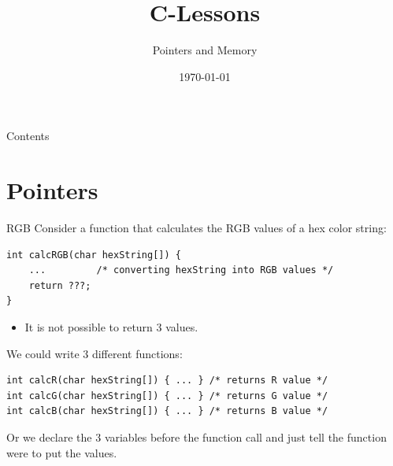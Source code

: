


\title{C-Lessons}
\subtitle{Pointers and Memory}
\date{\today}

\usetikzlibrary{tikzmark}
\usetikzlibrary{arrows}



\maketitle

\begin{frame}{Contents}
	\tableofcontents
\end{frame}

\section{Pointers}

\begin{frame}[fragile]{RGB}
	Consider a function that calculates the RGB values of a hex color string:
	\begin{lstlisting}[numbers=none]
int calcRGB(char hexString[]) {
	... 		/* converting hexString into RGB values */
	return ???;
}
\end{lstlisting}
	\begin{itemize}
		\item It is not possible to return 3 values.
	\end{itemize}
	We could write 3 different functions:
	\begin{lstlisting}[numbers=none]
int calcR(char hexString[]) { ... }	/* returns R value */
int calcG(char hexString[]) { ... }	/* returns G value */
int calcB(char hexString[]) { ... }	/* returns B value */
\end{lstlisting}
	Or we declare the 3 variables before the function call and just tell the function were to put the values.
\end{frame}



